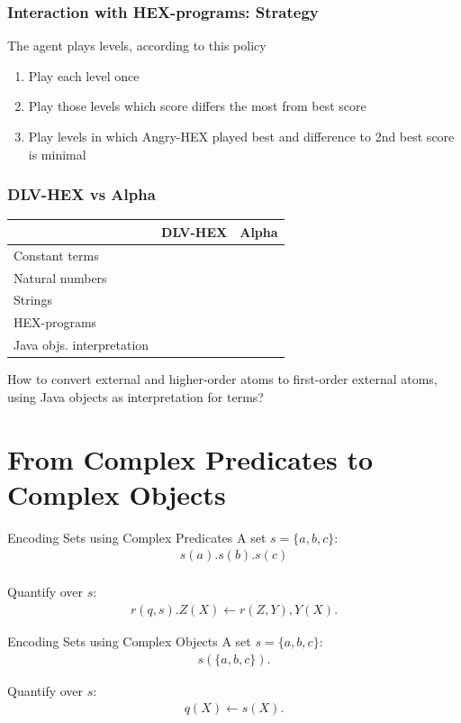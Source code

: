 \documentclass[smaller, dvipsnames]{beamer}
\newcommand{\ah}{Angry-HEX\xspace}
\newcommand{\al}{Alpha\xspace}
\begin{document}
\begin{frame}
	\frametitle{Interaction with HEX-programs: Strategy}
	The agent plays levels, according to this policy
	\begin{enumerate}
		\item Play each level once
		\item Play those levels which score differs the most from best score
		\item Play levels in which \ah played best and difference to 2nd best score is minimal
	\end{enumerate}
\end{frame}

\begin{frame}
	\frametitle{DLV-HEX vs \al}
	\begin{center}
		\begin{tabular}{lcc}
			\toprule
			& DLV-HEX & \al \\
			\midrule
			Constant terms & \checkmark & \checkmark \\
			Natural numbers & \checkmark & \checkmark \\
			Strings & \checkmark & \checkmark \\
			HEX-programs & \checkmark & \\
			Java objs. interpretation & & \checkmark \\
			\bottomrule
		\end{tabular}
	\end{center}
	How to convert external and higher-order atoms to first-order external atoms, using Java objects as interpretation for terms?
\end{frame}

\section{From Complex Predicates to Complex Objects}

\begin{frame}{Encoding Sets using Complex Predicates}
	A set \(s = \{ a, b, c \}\):
    \begin{align*}
    	s(a). s(b). s(c) \\
    \end{align*}

	Quantify over \(s\):
	\begin{align*}
		r(q,s).
		Z(X) \leftarrow r(Z,Y), Y(X).
	\end{align*}
\end{frame}

\begin{frame}{Encoding Sets using Complex Objects}
	A set \(s = \{ a, b, c \}\):
    \begin{align*}
    	s(\{a, b, c\}).
    \end{align*}

	Quantify over \(s\):
	\begin{align*}
		q(X) \leftarrow s(X).
	\end{align*}
\end{frame}
\end{document}
